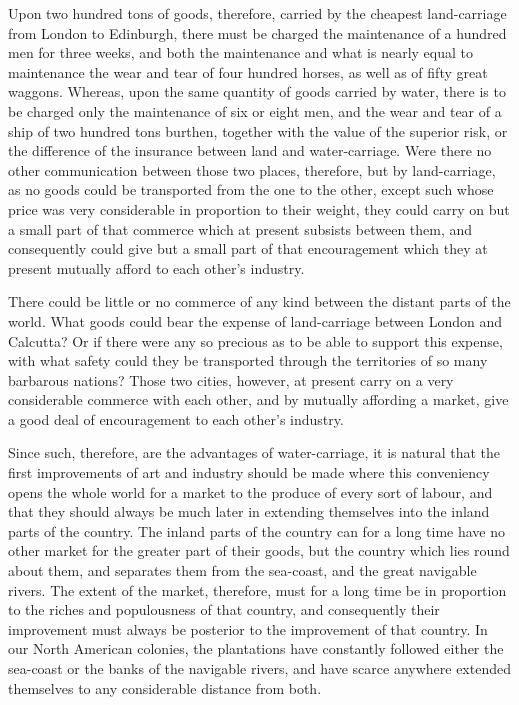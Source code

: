 Upon two hundred tons of goods, therefore, carried by the cheapest land-carriage from London to Edinburgh, there must be charged the maintenance of a hundred men for three weeks, and both the maintenance and what is nearly equal to maintenance the wear and tear of four hundred horses, as well as of fifty great waggons. Whereas, upon the same quantity of goods carried by water, there is to be charged only the maintenance of six or eight men, and the wear and tear of a ship of two hundred tons burthen, together with the value of the superior risk, or the difference of the insurance between land and water-carriage. Were there no other communication between those two places, therefore, but by land-carriage, as no goods could be transported from the one to the other, except such whose price was very considerable in proportion to their weight, they could carry on but a small part of that commerce which at present subsists between them, and consequently could give but a small part of that encouragement which they at present mutually afford to each other’s industry.\par

There could be little or no commerce of any kind between the distant parts of the world. What goods could bear the expense of land-carriage between London and Calcutta? Or if there were any so precious as to be able to support this expense, with what safety could they be transported through the territories of so many barbarous nations? Those two cities, however, at present carry on a very considerable commerce with each other, and by mutually affording a market, give a good deal of encouragement to each other’s industry.\par

Since such, therefore, are the advantages of water-carriage, it is natural that the first improvements of art and industry should be made where this conveniency opens the whole world for a market to the produce of every sort of labour, and that they should always be much later in extending themselves into the inland parts of the country. The inland parts of the country can for a long time have no other market for the greater part of their goods, but the country which lies round about them, and separates them from the sea-coast, and the great navigable rivers. The extent of the market, therefore, must for a long time be in proportion to the riches and populousness of that country, and consequently their improvement must always be posterior to the improvement of that country. In our North American colonies, the plantations have constantly followed either the sea-coast or the banks of the navigable rivers, and have scarce anywhere extended themselves to any considerable distance from both.\par

